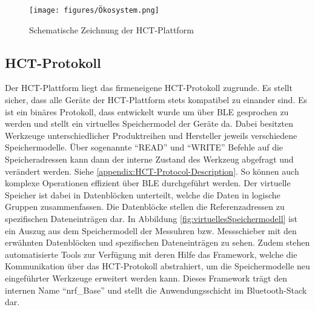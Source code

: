 \begin{figure}[H] 
	\centering
	\texttt{[image: figures/Ökosystem.png]}
	\caption{Schematische Zeichnung der \ac{HCT}-Plattform}
\end{figure}

\subsection{HCT-Protokoll}
Der \ac{HCT}-Plattform liegt das firmeneigene \ac{HCT}-Protokoll zugrunde. Es stellt sicher, dass alle Geräte der \ac{HCT}-Plattform stets kompatibel zu einander sind. Es ist ein binäres Protokoll, dass entwickelt wurde um über \ac{BLE} gesprochen zu werden und stellt ein virtuelles Speichermodel der Geräte da. Dabei besitzten Werkzeuge unterschiedlicher Produktreihen und Hersteller jeweils verschiedene Speichermodelle. Über sogenannte ``READ'' und ``WRITE'' Befehle auf die Speicheradressen kann dann der interne Zustand des Werkzeug abgefragt und verändert werden. Siehe \ref{appendix:HCT-Protocol-Description}. So können auch komplexe Operationen effizient über \ac{BLE} durchgeführt werden. Der virtuelle Speicher ist dabei in Datenblöcken unterteilt, welche die Daten in logische Gruppen zusammenfassen. Die Datenblöcke stellen die Referenzadressen zu spezifischen Dateneinträgen dar. In Abbildung \ref{fig:virtuellesSpeichermodell} ist ein Auszug aus dem Speichermodell der Messuhren bzw. Messschieber mit den erwähnten Datenblöcken und spezifischen Dateneinträgen zu sehen. Zudem stehen automatisierte Tools zur Verfügung mit deren Hilfe das Framework, welche die Kommunikation über das HCT-Protokoll abstrahiert, um die Speichermodelle neu eingeführter Werkzeuge erweitert werden kann. Dieses Framework trägt den internen Name ``nrf\_Base'' und stellt die Anwendungsschicht im Bluetooth-Stack dar.

